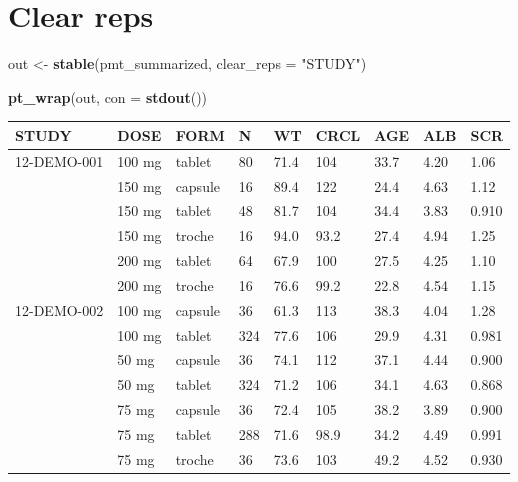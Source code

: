 \documentclass[
]{article}
\newenvironment{Shaded}{\begin{snugshade}}{\end{snugshade}}
\newcommand{\DataTypeTok}[1]{\textcolor[rgb]{0.13,0.29,0.53}{#1}}
\newcommand{\KeywordTok}[1]{\textcolor[rgb]{0.13,0.29,0.53}{\textbf{#1}}}
\newcommand{\NormalTok}[1]{#1}
\newcommand{\StringTok}[1]{\textcolor[rgb]{0.31,0.60,0.02}{#1}}
\begin{document}
\hypertarget{clear-reps}{%
\section{Clear reps}\label{clear-reps}}

\begin{Shaded}
\begin{Highlighting}[]
\NormalTok{out <-}\StringTok{ }\KeywordTok{stable}\NormalTok{(pmt_summarized, }\DataTypeTok{clear_reps =} \StringTok{"STUDY"}\NormalTok{)}

\KeywordTok{pt_wrap}\NormalTok{(out, }\DataTypeTok{con =} \KeywordTok{stdout}\NormalTok{()) }
\end{Highlighting}
\end{Shaded}

\begin{table}[h]
\centering
{\def\arraystretch{1.4}\tabcolsep=5pt
\begin{threeparttable}
\begin{tabular}[h]{lllllllll}
\hline
STUDY & DOSE & FORM & N & WT & CRCL & AGE & ALB & SCR \\
\hline
12-DEMO-001 & 100 mg & tablet & 80 & 71.4 & 104 & 33.7 & 4.20 & 1.06 \\
 & 150 mg & capsule & 16 & 89.4 & 122 & 24.4 & 4.63 & 1.12 \\
 & 150 mg & tablet & 48 & 81.7 & 104 & 34.4 & 3.83 & 0.910 \\
 & 150 mg & troche & 16 & 94.0 & 93.2 & 27.4 & 4.94 & 1.25 \\
 & 200 mg & tablet & 64 & 67.9 & 100 & 27.5 & 4.25 & 1.10 \\
 & 200 mg & troche & 16 & 76.6 & 99.2 & 22.8 & 4.54 & 1.15 \\
12-DEMO-002 & 100 mg & capsule & 36 & 61.3 & 113 & 38.3 & 4.04 & 1.28 \\
 & 100 mg & tablet & 324 & 77.6 & 106 & 29.9 & 4.31 & 0.981 \\
 & 50 mg & capsule & 36 & 74.1 & 112 & 37.1 & 4.44 & 0.900 \\
 & 50 mg & tablet & 324 & 71.2 & 106 & 34.1 & 4.63 & 0.868 \\
 & 75 mg & capsule & 36 & 72.4 & 105 & 38.2 & 3.89 & 0.900 \\
 & 75 mg & tablet & 288 & 71.6 & 98.9 & 34.2 & 4.49 & 0.991 \\
 & 75 mg & troche & 36 & 73.6 & 103 & 49.2 & 4.52 & 0.930 \\
\hline
\end{tabular}
\end{threeparttable}
}
\end{table}
\end{document}
